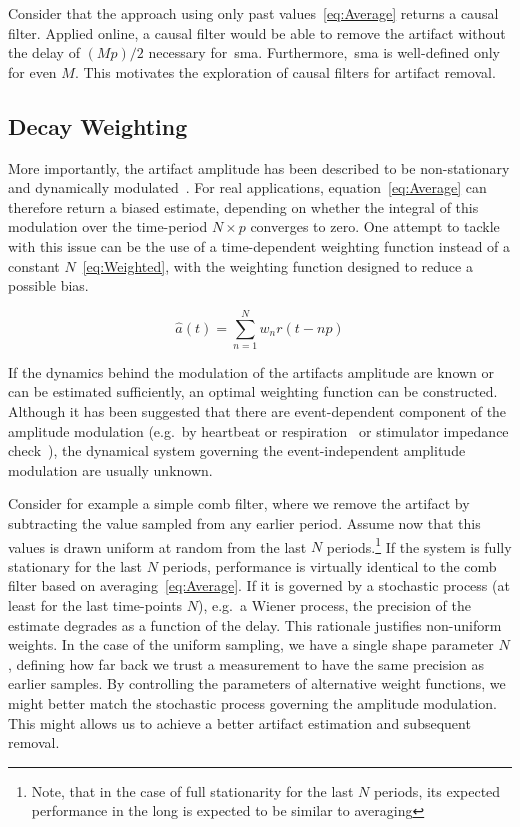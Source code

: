 \documentclass[a4paper]{article}
\begin{document}
Consider that the approach using only past values~\eqref{eq:Average} returns a causal filter. Applied online, a causal filter would be able to remove the artifact without the delay of $(Mp)/2$ necessary for~\gls{sma}. Furthermore,~\gls{sma} is well-defined only for even $M$. This motivates the exploration of causal filters for artifact removal.

\subsection{Decay Weighting}

More importantly, the artifact amplitude has been described to be non-stationary  and dynamically modulated~\citep{Noury_2016,Neuling_2017}.
For real applications, equation~\eqref{eq:Average} can therefore return a biased estimate, depending on whether the integral of this modulation over the time-period $N\times p$ converges to zero.
One attempt to tackle with this issue can be the use of a time-dependent weighting function instead of a constant $N$~\eqref{eq:Weighted}, with the weighting function designed to reduce a possible bias.

\begin{equation}
    \hat{a}(t) = \sum_{n=1}^{N} w_n r(t - np)\label{eq:Weighted}
\end{equation}

If the dynamics behind the modulation of the artifacts amplitude are known or can be estimated sufficiently, an optimal weighting function can be constructed. Although it has been suggested that there are event-dependent component of the amplitude modulation (e.g.\ by heartbeat or respiration~\cite{Noury_2016} or stimulator impedance check~\cite{Neuling_2017}), the dynamical system governing the event-independent amplitude modulation are usually unknown.

Consider for example a simple comb filter, where we remove the artifact by subtracting the value sampled from any earlier period. Assume now that this values is drawn uniform at random from the last $N$ periods.\footnote{Note, that in the case of full stationarity for the last $N$ periods, its expected performance in the long is expected to be similar to averaging}
If the system is fully stationary for the last $N$ periods, performance is virtually identical to the comb filter based on averaging~\eqref{eq:Average}. If it is governed by a stochastic process (at least for the last time-points $N$), e.g.\ a Wiener process, the precision of the estimate degrades as a function of the delay. This rationale justifies non-uniform weights.
In the case of the uniform sampling, we have a single shape parameter $N$, defining how far back we trust a measurement to have the same precision as earlier samples. By controlling the parameters of alternative weight functions, we might better match the stochastic process governing the amplitude modulation. This might allows us to achieve a better artifact estimation and subsequent removal.
\end{document}
